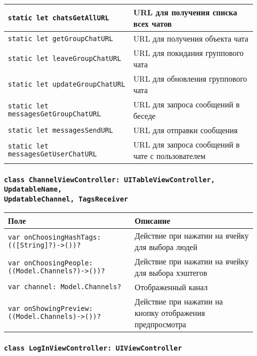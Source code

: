 \begin{longtable}{| >{\raggedright\arraybackslash}p{} | p{}|}
\texttt{static let chatsGetAllURL } & {URL для получения списка всех чатов} \\ \hline
\texttt{static let getGroupChatURL } & {URL для получения объекта чата} \\ \hline
\texttt{static let leaveGroupChatURL } & {URL для покидания группового чата} \\ \hline
\texttt{static let updateGroupChatURL } & {URL для обновления группового чата} \\ \hline
\texttt{static let messagesGetGroupChatURL } & {URL для запроса сообщений в беседе} \\ \hline
\texttt{static let messagesSendURL } & {URL для отправки сообщения} \\ \hline
\texttt{static let messagesGetUserChatURL } & {URL для запроса сообщений в чате с пользователем} \\ \hline
\end{longtable}

\subsubsection*{\texttt{class ChannelViewController: UITableViewController, UpdatableName,\\ UpdatableChannel, TagsReceiver}}

\begin{longtable}{| >{\raggedright\arraybackslash}p{} | p{}|}
\hline
\textbf{Поле} & \textbf{Описание} \\ \hline
\texttt{var onChoosingHashTags: (([String]?)->())?} & {Действие при нажатии на ячейку для выбора людей} \\ \hline
\texttt{var onChoosingPeople: ((Model.Channels?)->())?} & {Действие при нажатии на ячейку для выбора хэштегов} \\ \hline
\texttt{var channel: Model.Channels?} & {Отображенный канал} \\ \hline
\texttt{var onShowingPreview: ((Model.Channels)->())?} & {Действие при нажатии на кнопку отображения предпросмотра} \\ \hline
\end{longtable}



\subsubsection*{\texttt{class LogInViewController: UIViewController}}

